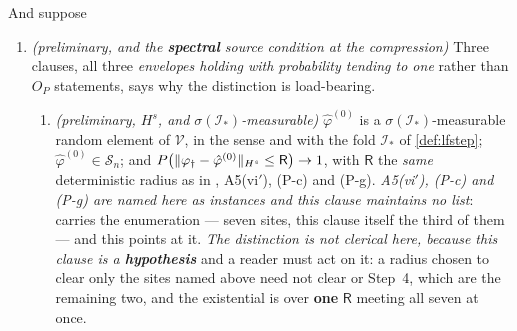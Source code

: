 \begin{proposition}[The rate for the $\varphi$-step]
And suppose
\begin{enumerate}
\item[(P-a)] \emph{(preliminary, and the \textbf{spectral} source condition at the compression)} Three
clauses, all three \emph{envelopes holding with probability tending to one} rather than $O_P$
statements,  says why the distinction is load-bearing.
\begin{enumerate}
\item[(P-a.1)] \emph{(preliminary, $H^{s}$, and $\sigma(\mathcal I_\ast)$-measurable)}
$\hat\varphi^{(0)}$ is a $\sigma(\mathcal I_\ast)$-measurable random element of $\mathcal V$, in the sense and
with the fold $\mathcal I_\ast$ of \cref{def:lfstep}; $\hat\varphi^{(0)}\in\mathcal S_n$; and
$P\big(\|\varphi_{\dagger}-\hat\varphi^{(0)}\|_{H^{s}}\le\mathsf R\big)\to1$, with $\mathsf R$ the
\emph{same} deterministic radius as in , A5(vi$'$), (P-c) and (P-g).
\emph{A5(vi$'$), (P-c) and (P-g) are named here as instances and this clause maintains no list}:
 carries the enumeration --- seven sites, this clause itself the third of
them --- and this points at it. \emph{The distinction is not clerical here, because this clause is a
\textbf{hypothesis}} and a reader must act on it: a radius chosen to clear only the sites named above
need not clear  or  Step~4, which are the remaining two, and the
existential is over \textbf{one} $\mathsf R$ meeting all seven at once.

\end{enumerate}
\end{enumerate}
\end{proposition}
